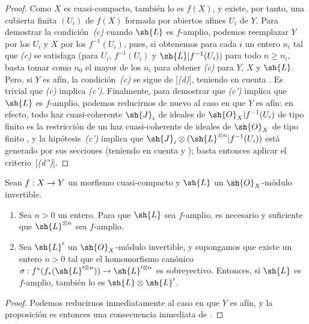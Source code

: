 \documentclass[oneside,10pt]{amsart}
\makeatletter
\renewcommand{\geq}{\geqslant}
\newcommand{\ega@arrow}[2]{\mathchoice{#1}{#2}{#2}{#2}}
\renewcommand{\to}{\ega@arrow{\longrightarrow}{\rightarrow}}
\newcommand{\oldpage}[2][]{\marginnote{\normalfont\footnotesize\textbf{#1}~|~#2}\ignorespaces}
\let\EGAOriginalLabel\label
\renewcommand{\label}[1]{\phantomsection\EGAOriginalLabel{#1}}
\makeatother
\begin{document}
\begin{proof}
Como $X$ es cuasi-compacto, también lo es $f(X)$, y existe, por tanto, una cubierta finita $(U_i)$ de $f(X)$ formada por abiertos afines $U_i$ de $Y$.
Para demostrar la condición~\emph{(c)} cuando $\sh{L}$ es $f$-amplio, podemos reemplazar $Y$ por los $U_i$ y $X$ por los $f^{-1}(U_i)$, pues, si obtenemos para cada $i$ un entero $n_i$ tal que \emph{(c)} se satisfaga (para $U_i$, $f^{-1}(U_i)$ y $\sh{L}|f^{-1}(U_i)$) para todo $n\geq n_i$, basta tomar como $n_0$ el mayor de los $n_i$ para obtener \emph{(c)} para $Y$, $X$ y $\sh{L}$.
Pero, si $Y$ es afín, la condición~\emph{(c)} se sigue de [\emph{(d)}], teniendo en cuenta .
Es trivial que \emph{(c)} implica \emph{(c')}.
Finalmente, para demostrar que \emph{(c')} implica que $\sh{L}$ es $f$-amplio, podemos reducirnos de nuevo al caso en que $Y$ es afín:
en efecto, todo haz cuasi-coherente $\sh{J}_i$ de ideales de $\sh{O}_X|f^{-1}(U_i)$ de tipo finito es la restricción de un haz cuasi-coherente de ideales de $\sh{O}_X$ de tipo finito , y la hipótesis~\emph{(c')} implica que
\oldpage[II]{91}
$\sh{J}_i\otimes(\sh{L}^{\otimes n}|f^{-1}(U_i))$ está generado por sus secciones (teniendo en cuenta  y );
basta entonces aplicar el criterio~[\emph{(d'')}].
\end{proof}

\begin{proposition}[4.6.9]
\label{II.4.6.9}
Sean $f:X\to Y$ un morfismo cuasi-compacto y $\sh{L}$ un $\sh{O}_X$-módulo invertible.
\begin{enumerate}
  \item[\rm{(i)}] Sea $n>0$ un entero.
    Para que $\sh{L}$ sea $f$-amplio, es necesario y suficiente que $\sh{L}^{\otimes n}$ sea $f$-amplio.
  \item[\rm{(ii)}] Sea $\sh{L}'$ un $\sh{O}_X$-módulo invertible, y supongamos que existe un entero $n>0$ tal que el homomorfismo canónico $\sigma:f^*(f_*(\sh{L}'^{\otimes n}))\to\sh{L}'^{\otimes n}$ es sobreyectivo.
    Entonces, si $\sh{L}$ es $f$-amplio, también lo es $\sh{L}\otimes\sh{L}'$.
\end{enumerate}
\end{proposition}

\begin{proof}
Podemos reducirnos inmediatamente al caso en que $Y$ es afín, y la proposición es entonces una consecuencia inmediata de .
\end{proof}
\end{document}
